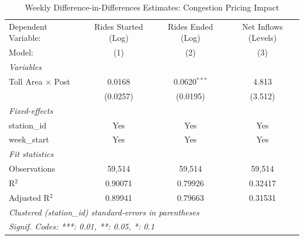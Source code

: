 
\begin{table}[htbp]
   \caption{\label{tab:did_static_weekly} Weekly Difference-in-Differences Estimates: Congestion Pricing Impact}
   \centering
   \begin{tabular}{lccc}
      \tabularnewline \midrule \midrule
      Dependent Variable:      & Rides Started (Log) & Rides Ended (Log) & Net Inflows (Levels) \\   
      Model:                   & (1)                 & (2)               & (3)\\  
      \midrule
      \emph{Variables}\\
      Toll Area $\times$ Post  & 0.0168              & 0.0620$^{***}$    & 4.813\\   
                               & (0.0257)            & (0.0195)          & (3.512)\\   
      \midrule
      \emph{Fixed-effects}\\
      station\_id              & Yes                 & Yes               & Yes\\  
      week\_start              & Yes                 & Yes               & Yes\\  
      \midrule
      \emph{Fit statistics}\\
      Observations             & 59,514              & 59,514            & 59,514\\  
      R$^2$                    & 0.90071             & 0.79926           & 0.32417\\  
      Adjusted R$^2$           & 0.89941             & 0.79663           & 0.31531\\  
      \midrule \midrule
      \multicolumn{4}{l}{\emph{Clustered (station\_id) standard-errors in parentheses}}\\
      \multicolumn{4}{l}{\emph{Signif. Codes: ***: 0.01, **: 0.05, *: 0.1}}\\
   \end{tabular}
\end{table}


